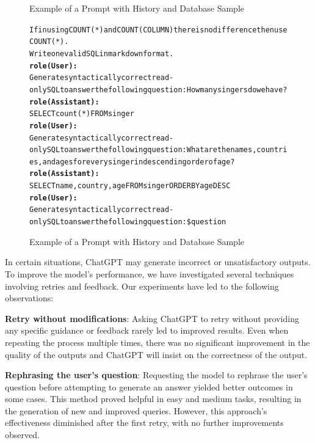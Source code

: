 \begin{figure}[H]
\begin{AIbox}{Example of a Prompt with History and Database Sample}
{\begin{alltt}
            If in using  COUNT(*) and COUNT(COLUMN) there is no difference then use COUNT(*). \\
            Write one valid SQL in markdown format.
            \\
            {\bf role(User):} \\
            Generate syntactically correct read-only SQL to answer the following question: How many singers do we have?
            \\
            {\bf role(Assistant):} \\
            SELECT count(*) FROM singer
            \\
            {\bf role(User):} \\
            Generate syntactically correct read-only SQL to answer the following question: What are the names, countries, and ages for every singer in descending order of age?
            \\
            {\bf role(Assistant):} \\
            SELECT name,  country,  age FROM singer ORDER BY age DESC
            \\
            {\bf role(User):} \\
            Generate syntactically correct read-only SQL to answer the following question: \$question
        \end{alltt}
        }
        \vspace{-5px}
    \end{AIbox}
    \caption{Example of a Prompt with History and Database Sample}
\end{figure}


In certain situations, ChatGPT may generate incorrect or unsatisfactory outputs. To improve the model's performance, we have investigated several techniques involving retries and feedback. Our experiments have led to the following observations:

\textbf{Retry without modifications}: Asking ChatGPT to retry without providing any specific guidance or feedback rarely led to improved results. Even when repeating the process multiple times, there was no significant improvement in the quality of the outputs and ChatGPT will insist on the correctness of the output.

\textbf{Rephrasing the user's question}: Requesting the model to rephrase the user's question before attempting to generate an answer yielded better outcomes in some cases. This method proved helpful in easy and medium tasks, resulting in the generation of new and improved queries. However, this approach's effectiveness diminished after the first retry, with no further improvements observed.

